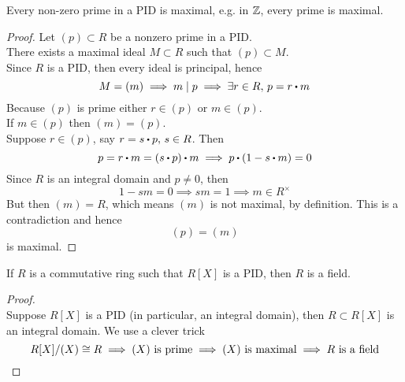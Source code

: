 \documentclass[../Main.tex]{subfiles}
\begin{document}
\begin{thm}[title = Nonzero primes ideals are maximal in PID]
	Every non-zero prime in a PID is maximal, e.g. in $\mathbb{Z}$, every prime is maximal.
\end{thm}
\begin{proof}
	Let $(p)\subset R$ be a nonzero prime in a PID.\\
	There exists a maximal ideal $M\subset R $ such that $(p)\subset M$.\\
	Since $R$ is a PID, then every ideal is principal, hence
	\[M=(m) \implies m\mid p \implies \exists r\in R, \, p=r\rdot m\]
	Because $(p)$ is prime either $r\in (p)$ or $m \in (p)$.\\
	If $m\in (p)$ then $(m)=(p)$. \\
	Suppose $r\in (p)$, say $r=s\rdot p,\, s\in R$. Then 
	\[p=r\rdot m=(s\rdot p)\rdot m \implies p\rdot (1-s\rdot m)=0\]
	Since $R$ is an integral domain and $p\ne 0$, then 
	\[1-sm=0\implies sm =1 \implies  m\in R^\times\]
	But then $(m) = R$, which means $(m)$ is not maximal, by definition. This is a contradiction and hence 
	\[(p)=(m)\]
	is maximal.
\end{proof}
\begin{thm}[title = If \texorpdfstring{$R[X]$}{R[X]} is PID then \texorpdfstring{$R$}{R} is field]
	If $R$ is a commutative ring such that $R[X]$ is a PID, then $R$ is a field.
\end{thm}
\begin{proof}~\\
	Suppose $R[X]$ is a PID (in particular, an integral domain), then $R\subset R[X]$ is an integral domain. We use a clever trick
	\[R[X]/(X) \cong R \implies (X) \text{ is prime} \implies (X) \text{ is maximal} \implies R \text{ is a field}\qedhere\]
\end{proof}
\end{document}
